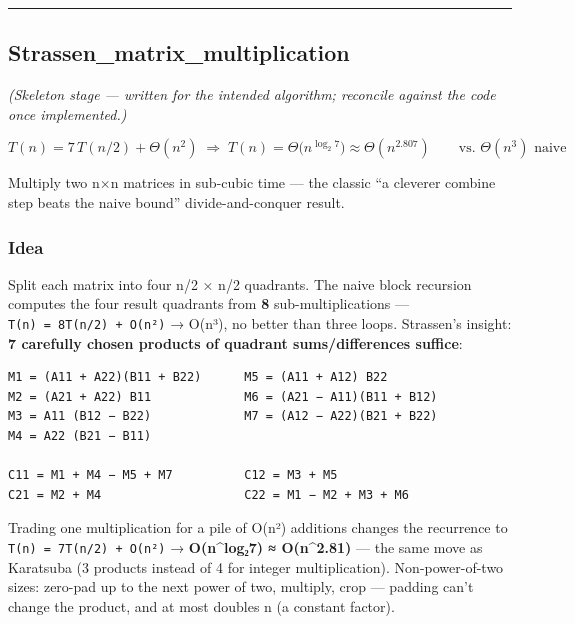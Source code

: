 \documentclass[
  10pt,
  letterpaper,
  onecolumn]{article}
\begin{document}
\begin{center}\rule{0.5\linewidth}{0.5pt}\end{center}

\hypertarget{strassen_matrix_multiplication}{%
\subsection{Strassen\_matrix\_multiplication}\label{strassen_matrix_multiplication}}

\emph{(Skeleton stage --- written for the intended algorithm; reconcile
against the code once implemented.)}

\begin{equation*}
T(n)=7\,T(n/2)+\Theta(n^2)
\;\Longrightarrow\;
T(n)=\Theta\bigl(n^{\log_2 7}\bigr)\approx\Theta(n^{2.807})
\qquad\text{vs. }\Theta(n^3)\text{ naive}
\end{equation*}

Multiply two n×n matrices in sub-cubic time --- the classic ``a cleverer
combine step beats the naive bound'' divide-and-conquer result.

\hypertarget{idea-5}{%
\subsubsection{Idea}\label{idea-5}}

Split each matrix into four n/2 × n/2 quadrants. The naive block
recursion computes the four result quadrants from \textbf{8}
sub-multiplications --- \texttt{T(n)\ =\ 8T(n/2)\ +\ O(n²)} → O(n³), no
better than three loops. Strassen's insight: \textbf{7 carefully chosen
products of quadrant sums/differences suffice}:

\begin{verbatim}
M1 = (A11 + A22)(B11 + B22)      M5 = (A11 + A12) B22
M2 = (A21 + A22) B11             M6 = (A21 − A11)(B11 + B12)
M3 = A11 (B12 − B22)             M7 = (A12 − A22)(B21 + B22)
M4 = A22 (B21 − B11)

C11 = M1 + M4 − M5 + M7          C12 = M3 + M5
C21 = M2 + M4                    C22 = M1 − M2 + M3 + M6
\end{verbatim}

Trading one multiplication for a pile of O(n²) additions changes the
recurrence to \texttt{T(n)\ =\ 7T(n/2)\ +\ O(n²)} →
\textbf{O(n\^{}log₂7) ≈ O(n\^{}2.81)} --- the same move as Karatsuba (3
products instead of 4 for integer multiplication). Non-power-of-two
sizes: zero-pad up to the next power of two, multiply, crop --- padding
can't change the product, and at most doubles n (a constant factor).
\end{document}
